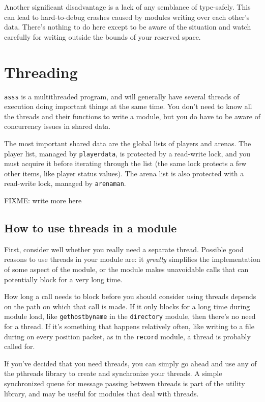 \documentclass{article}
\newcommand{\asss}{\texttt{asss}}
\begin{document}
Another significant disadvantage is a lack of any semblance of
type-safely. This can lead to hard-to-debug crashes caused by modules
writing over each other's data. There's nothing to do here except to be
aware of the situation and watch carefully for writing outside the
bounds of your reserved space.


\section{Threading}

\asss{} is a multithreaded program, and will generally have several
threads of execution doing important things at the same time. You don't
need to know all the threads and their functions to write a module, but
you do have to be aware of concurrency issues in shared data.

The most important shared data are the global lists of players and
arenas. The player list, managed by \verb/playerdata/, is protected by a
read-write lock, and you must acquire it before iterating through the
list (the same lock protects a few other items, like player status
values). The arena list is also protected with a read-write lock,
managed by \verb/arenaman/.

FIXME: write more here


\subsection{How to use threads in a module}

First, consider well whether you really need a separate thread. Possible
good reasons to use threads in your module are: it \emph{greatly}
simplifies the implementation of some aspect of the module, or the
module makes unavoidable calls that can potentially block for a very
long time.

How long a call needs to block before you should consider using threads
depends on the path on which that call is made. If it only blocks for a
long time during module load, like \verb/gethostbyname/ in the
\verb/directory/ module, then there's no need for a thread. If it's
something that happens relatively often, like writing to a file during
on every position packet, as in the \verb/record/ module, a thread is
probably called for.

If you've decided that you need threads, you can simply go ahead and use
any of the pthreads library to create and synchronize your threads. A
simple synchronized queue for message passing between threads is part of
the utility library, and may be useful for modules that deal with
threads.
\end{document}
